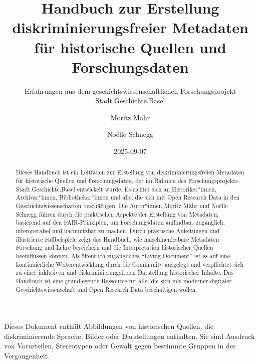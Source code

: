 \documentclass[
  nswissgerman,
  letterpaper,
  DIV=11,
  numbers=noendperiod]{scrartcl}
\title{Handbuch zur Erstellung diskriminierungsfreier Metadaten für
historische Quellen und Forschungsdaten}
\subtitle{Erfahrungen aus dem geschichtswissenschaftlichen
Forschungsprojekt Stadt.Geschichte.Basel}
\author{Moritz Mähr \and Noëlle Schnegg}
\date{2025-09-07}
\begin{document}
\maketitle
\begin{abstract}
Dieses Handbuch ist ein Leitfaden zur Erstellung von
diskriminierungsfreien Metadaten für historische Quellen und
Forschungsdaten, der im Rahmen des Forschungsprojekts
Stadt.Geschichte.Basel entwickelt wurde. Es richtet sich an
Historiker*innen, Archivar*innen, Bibliothekar*innen und alle, die sich
mit Open Research Data in den Geschichtswissenschaften beschäftigen. Die
Autor*innen Moritz Mähr und Noëlle Schnegg führen durch die praktischen
Aspekte der Erstellung von Metadaten, basierend auf den FAIR-Prinzipien,
um Forschungsdaten auffindbar, zugänglich, interoperabel und nachnutzbar
zu machen. Durch praktische Anleitungen und illustrierte Fallbeispiele
zeigt das Handbuch, wie maschinenlesbare Metadaten Forschung und Lehre
bereichern und die Interpretation historischer Quellen beeinflussen
können. Als öffentlich zugängliches ``Living Document'' ist es auf eine
kontinuierliche Weiterentwicklung durch die Community ausgelegt und
verpflichtet sich zu einer inklusiven und diskriminierungsfreien
Darstellung historischer Inhalte. Das Handbuch ist eine grundlegende
Ressource für alle, die sich mit moderner digitaler
Geschichtswissenschaft und Open Research Data beschäftigen wollen.
\end{abstract}


\begin{tcolorbox}[enhanced jigsaw, arc=.35mm, bottomrule=.15mm, bottomtitle=1mm, breakable, colback=white, colbacktitle=quarto-callout-warning-color!10!white, colframe=quarto-callout-warning-color-frame, coltitle=black, left=2mm, leftrule=.75mm, opacityback=0, opacitybacktitle=0.6, rightrule=.15mm, title=\textcolor{quarto-callout-warning-color}{\faExclamationTriangle}\hspace{0.5em}{Warnung}, titlerule=0mm, toprule=.15mm, toptitle=1mm]

Dieses Dokument enthält Abbildungen von historischen Quellen, die
diskriminierende Sprache, Bilder oder Darstellungen enthalten. Sie sind
Ausdruck von Vorurteilen, Stereotypen oder Gewalt gegen bestimmte
Gruppen in der Vergangenheit.

\end{tcolorbox}
\end{document}
